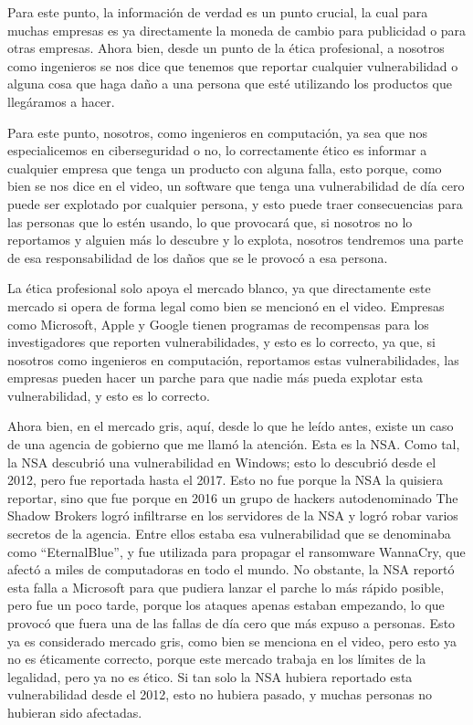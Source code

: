 \documentclass[letterpaper,11pt]{article}
\begin{document}
Para este punto, la información de verdad es un punto crucial, la cual para muchas empresas 
es ya directamente la moneda de cambio para publicidad o para otras empresas. Ahora bien, 
desde un punto de la ética profesional, a nosotros como ingenieros se nos 
dice que tenemos que reportar cualquier vulnerabilidad o alguna cosa que haga daño a una persona que esté 
utilizando los productos que llegáramos a hacer.

Para este punto, nosotros, como ingenieros en computación, ya sea 
que nos especialicemos en ciberseguridad o no, lo correctamente ético 
es informar a cualquier empresa que tenga un producto 
con alguna falla, esto porque, como bien se nos dice en el video, 
un software que tenga una vulnerabilidad de día cero puede ser explotado por cualquier persona, 
y esto puede traer consecuencias para las personas que lo estén usando, 
lo que provocará que, si nosotros no lo reportamos y alguien más lo 
descubre y lo explota, nosotros 
tendremos una parte de esa responsabilidad de los daños que se le provocó a esa persona.

La ética profesional solo apoya el mercado blanco,
ya que directamente este mercado si opera de forma legal 
como bien se mencionó en el video. Empresas como Microsoft, Apple 
y Google tienen programas de recompensas para los investigadores que reporten vulnerabilidades,
y esto es lo correcto, ya que, si nosotros como ingenieros en computación,
reportamos estas vulnerabilidades, las empresas pueden hacer un parche para que nadie más pueda explotar
esta vulnerabilidad, y esto es lo correcto.

Ahora bien, en el mercado gris, aquí, desde lo que he leído antes, existe un caso de una agencia de gobierno que me llamó 
la atención. Esta es la NSA. Como tal, la NSA descubrió una vulnerabilidad en 
Windows; esto lo descubrió desde el 2012, pero fue reportada hasta el 2017. 
Esto no fue porque la NSA la quisiera reportar, sino que fue 
porque en 2016 un grupo de hackers autodenominado 
The Shadow Brokers logró infiltrarse en los servidores de la NSA
y logró robar varios secretos de la agencia. Entre ellos 
estaba esa vulnerabilidad que se denominaba como ``EternalBlue'',
y fue utilizada para propagar el ransomware WannaCry, 
que afectó a miles de computadoras en todo el mundo. 
No obstante, la NSA reportó esta falla a Microsoft para que pudiera lanzar el parche lo más rápido 
posible, pero fue un poco tarde, porque los ataques apenas estaban empezando, 
lo que provocó que fuera una de las fallas de día cero que más expuso a personas.
Esto ya es considerado mercado gris, como bien se menciona en el video, pero esto ya no es éticamente 
correcto, porque este mercado trabaja en los límites de la legalidad, pero ya no es ético.
Si tan solo la NSA hubiera reportado esta vulnerabilidad desde el 2012, esto no hubiera pasado, 
y muchas personas no hubieran sido afectadas.
\end{document}
